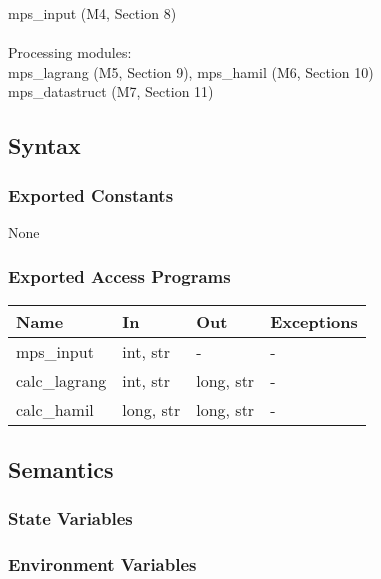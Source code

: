 \documentclass[12pt, titlepage]{article}
\begin{document}
mps\_input (M4, Section 8)\\\\
Processing modules:\\
mps\_lagrang (M5, Section 9), mps\_hamil (M6, Section 10)\\
mps\_datastruct (M7, Section 11)\\

\subsection{Syntax}

\subsubsection{Exported Constants}

None

\subsubsection{Exported Access Programs}

\begin{center}
\begin{tabular}{p{2cm} p{4cm} p{4cm} p{2cm}}
\hline
\textbf{Name} & \textbf{In} & \textbf{Out} & \textbf{Exceptions} \\
\hline
mps\_input  & int, str & - & - \\
calc\_lagrang & int, str & long, str & - \\
calc\_hamil & long, str & long, str & - \\
\hline
\end{tabular}
\end{center}

\subsection{Semantics}

\subsubsection{State Variables}

\subsubsection{Environment Variables}

\end{document}
